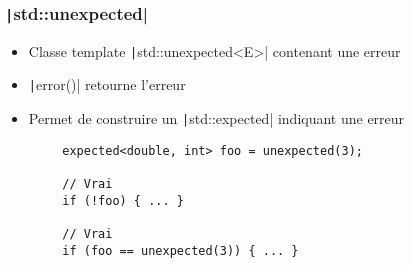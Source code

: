 \documentclass[C++.tex]{subfiles}
\begin{document}
\begin{frame}[fragile]

\end{frame}

\begin{frame}[fragile]
	\frametitle{\texttt|std::unexpected|}
	\begin{itemize}
		\item Classe template \texttt|std::unexpected<E>| contenant une erreur
		\item \texttt|error()| retourne l'erreur
		\item Permet de construire un \texttt|std::expected| indiquant une erreur
	\end{itemize}

	\begin{verbatim}
		expected<double, int> foo = unexpected(3);

		// Vrai
		if (!foo) { ... }

		// Vrai
		if (foo == unexpected(3)) { ... }
	\end{verbatim}

\end{frame}
\end{document}
